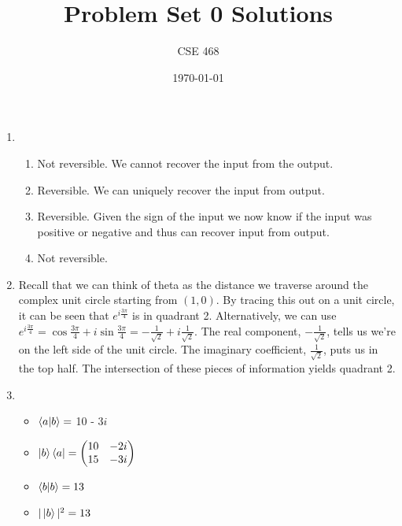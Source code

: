 \documentclass[12pt]{article}
\title{Problem Set 0 Solutions}
\author{CSE 468}
\date{\today}
\begin{document}
\maketitle

\begin{enumerate}[font=\bfseries]
    \item \begin{enumerate}
        \item Not reversible. We cannot recover the input from the output.
        \item Reversible. We can uniquely recover the input from output.
        \item Reversible. Given the sign of the input we now know if the input was positive or negative and thus can recover input from output.
        \item Not reversible.
    \end{enumerate}
    \item Recall that we can think of theta as the distance we traverse around the complex unit circle starting from $(1,0)$. By tracing this out on a unit circle, it can be seen that $e^{i\frac{3\pi}{4}}$ is in quadrant 2.
    Alternatively, we can use $e^{i\frac{3\pi}{4}} = \cos{\frac{3\pi}{4}}+i\sin{\frac{3\pi}{4}} = -\frac{1}{\sqrt{2}}+i\frac{1}{\sqrt{2}}$.
    The real component, $-\frac{1}{\sqrt{2}}$, tells us we're on the left side of the unit circle. The imaginary coefficient, $\frac{1}{\sqrt{2}}$, puts us in the top half. The intersection of these pieces of information yields quadrant 2.
    \item \begin{itemize}
        \item $\braket{a|b} =$ 10 - 3$i$
        \item $\ket{b}\bra{a} = \begin{pmatrix} 10 & -2i \\ 15 & -3i \end{pmatrix}$
        \item $\braket{b|b} = 13$
        \item $|\ket{b}|^2 = 13$
    \end{itemize}
\end{enumerate}
\end{document}
